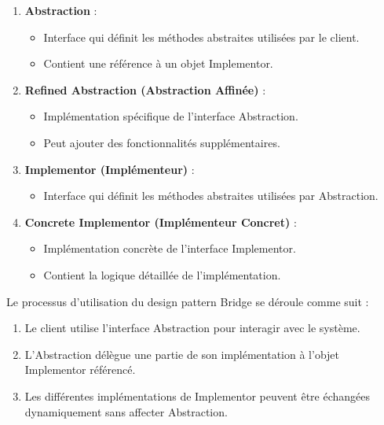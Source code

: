 \documentclass[french]{article}
\begin{document}
\begin{enumerate}
    \item \textbf{Abstraction} :
    \begin{itemize}
        \item Interface qui définit les méthodes abstraites utilisées par le client.
        \item Contient une référence à un objet Implementor.
    \end{itemize}
    
    \item \textbf{Refined Abstraction (Abstraction Affinée)} :
    \begin{itemize}
        \item Implémentation spécifique de l'interface Abstraction.
        \item Peut ajouter des fonctionnalités supplémentaires.
    \end{itemize}
    
    \item \textbf{Implementor (Implémenteur)} :
    \begin{itemize}
        \item Interface qui définit les méthodes abstraites utilisées par Abstraction.
    \end{itemize}
    
    \item \textbf{Concrete Implementor (Implémenteur Concret)} :
    \begin{itemize}
        \item Implémentation concrète de l'interface Implementor.
        \item Contient la logique détaillée de l'implémentation.
    \end{itemize}
\end{enumerate}

Le processus d'utilisation du design pattern Bridge se déroule comme suit :

\begin{enumerate}
    \item Le client utilise l'interface Abstraction pour interagir avec le système.
    \item L'Abstraction délègue une partie de son implémentation à l'objet Implementor référencé.
    \item Les différentes implémentations de Implementor peuvent être échangées dynamiquement sans affecter Abstraction.
\end{enumerate}
\end{document}
